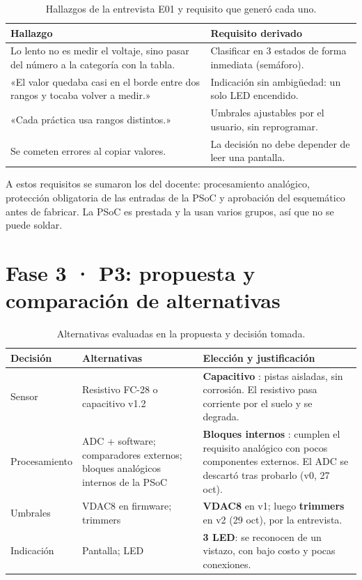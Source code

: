 \documentclass[11pt,a4paper]{article}
\begin{document}
\begin{table}[H]\centering\small
\caption{Hallazgos de la entrevista E01 y requisito que generó cada uno.}
\begin{tabularx}{\linewidth}{>{\raggedright\arraybackslash}X>{\raggedright\arraybackslash}X}
\toprule
Hallazgo & Requisito derivado \\
\midrule
Lo lento no es medir el voltaje, sino pasar del número a la categoría con la tabla. & Clasificar en 3 estados de forma inmediata (semáforo). \\
«El valor quedaba casi en el borde entre dos rangos y tocaba volver a medir.» & Indicación sin ambigüedad: un solo LED encendido. \\
«Cada práctica usa rangos distintos.» & Umbrales ajustables por el usuario, sin reprogramar. \\
Se cometen errores al copiar valores. & La decisión no debe depender de leer una pantalla. \\
\bottomrule
\end{tabularx}
\end{table}

A estos requisitos se sumaron los del docente: procesamiento analógico, protección obligatoria de las entradas de la PSoC y aprobación del esquemático antes de fabricar. La PSoC es prestada y la usan varios grupos, así que no se puede soldar.

\section{Fase 3 · P3: propuesta y comparación de alternativas}\label{sec:f3}
\begin{table}[H]\centering\small
\caption{Alternativas evaluadas en la propuesta y decisión tomada.}
\begin{tabularx}{\linewidth}{>{\raggedright\arraybackslash}p{2.6cm}>{\raggedright\arraybackslash}X>{\raggedright\arraybackslash}X}
\toprule
Decisión & Alternativas & Elección y justificación \\
\midrule
Sensor & Resistivo FC-28 o capacitivo v1.2 & \textbf{Capacitivo} \cite{dfrobot}: pistas aisladas, sin corrosión. El resistivo pasa corriente por el suelo y se degrada. \\
Procesamiento & ADC + software; comparadores externos; bloques analógicos internos de la PSoC & \textbf{Bloques internos} \cite{psoc}: cumplen el requisito analógico con pocos componentes externos. El ADC se descartó tras probarlo (v0, 27 oct). \\
Umbrales & VDAC8 en firmware; trimmers & \textbf{VDAC8} en v1; luego \textbf{trimmers} en v2 (29 oct), por la entrevista. \\
Indicación & Pantalla; LED & \textbf{3 LED}: se reconocen de un vistazo, con bajo costo y pocas conexiones. \\
\bottomrule
\end{tabularx}
\end{table}
\end{document}
